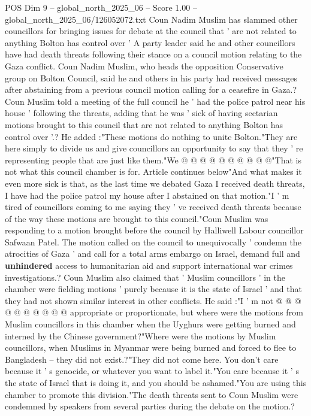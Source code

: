 \begin{textsample}{POS Dim 9 – global\_north\_2025\_06 – Score 1.00 – global\_north\_2025\_06/126052072.txt}  \label{ex:f9_pos_376}
Coun Nadim Muslim has slammed other councillors for bringing issues for debate at the council that ' are not related to anything Bolton has control over ' A party leader said he and other councillors have had death threats following their stance on a council motion relating to the Gaza conflict.
Coun Nadim Muslim, who heads the opposition Conservative group on Bolton Council, said he and others in his party had received messages after abstaining from a previous council motion calling for a ceasefire in Gaza.?
Coun Muslim told a meeting of the full council he ' had the police patrol near his house ' following the threats, adding that he was ' sick of having sectarian motions brought to this council that are not related to anything Bolton has control over '.?
He added :"These motions do nothing to unite Bolton."They are here simply to divide us and give councillors an opportunity to say that they ' re representing people that are just like them."We @ @ @ @ @ @ @ @ @ @"That is not what this council chamber is for.
Article continues below"And what makes it even more sick is that, as the last time we debated Gaza I received death threats, I have had the police patrol my house after I abstained on that motion."I ' m tired of councillors coming to me saying they ' ve received death threats because of the way these motions are brought to this council."Coun Muslim was responding to a motion brought before the council by Halliwell Labour councillor Safwaan Patel.
The motion called on the council to unequivocally ' condemn the atrocities of Gaza ' and call for a total arms embargo on Israel, demand full and \textbf{unhindered} access to humanitarian aid and support international war crimes investigations.?
Coun Muslim also claimed that ' Muslim councillors ' in the chamber were fielding motions ' purely because it is the state of Israel ' and that they had not shown similar interest in other conflicts.
He said :"I ' m not @ @ @ @ @ @ @ @ @ @ appropriate or proportionate, but where were the motions from Muslim councillors in this chamber when the Uyghurs were getting burned and interned by the Chinese government?"Where were the motions by Muslim councillors, when Muslims in Myanmar were being burned and forced to flee to Bangladesh -- they did not exist.?"They did not come here.
You don't care because it ' s genocide, or whatever you want to label it."You care because it ' s the state of Israel that is doing it, and you should be ashamed."You are using this chamber to promote this division."The death threats sent to Coun Muslim were condemned by speakers from several parties during the debate on the motion.?

\end{textsample}
